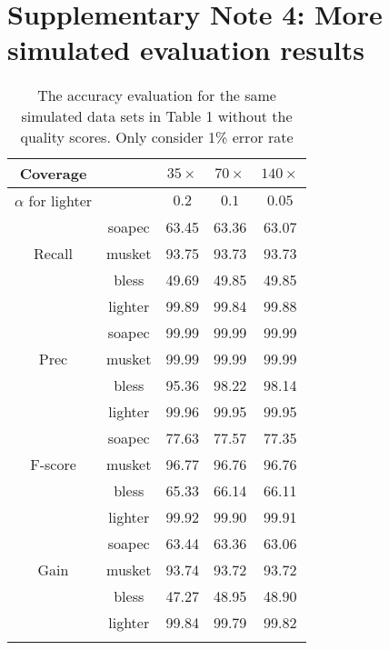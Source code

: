\documentclass[10pt]{article}
\begin{document}

\section*{Supplementary Note 4: More simulated evaluation results}
\begin{table}[h!]
\caption{The accuracy evaluation for the same simulated data sets in Table 1 without the quality scores. Only consider 1\% error rate}
\begin{tabular}{|c|c|c|c|c|}  \hline
Coverage &	&$35\times$  & $70\times$ & $140\times$ \\ \hline
$\alpha$ for lighter & & $0.2$ & $0.1$ & $0.05$ \\ \hhline{|=|=|=|=|=|}
		&soapec	&63.45	&63.36	&63.07  \\ \hline
Recall	&musket	&93.75	&93.73	&93.73   \\ \hline
		&bless	&49.69	&49.85	&49.85	 \\ \hline
		&lighter	&99.89	&99.84	&99.88	 \\ \hhline{|=|=|=|=|=|}
		
		&soapec	&99.99	&99.99	&99.99    \\ \hline
Prec	&musket	&99.99	&99.99	&99.99	 \\ \hline
		&bless	&95.36	&98.22	&98.14	 \\ \hline
		&lighter	&99.96	&99.95	&99.95	 \\  \hhline{|=|=|=|=|=|}
		
		&soapec	&77.63	&77.57	&77.35	 \\ \hline
F-score	&musket	&96.77	&96.76	&96.76	 \\ \hline
		&bless	&65.33	&66.14	&66.11	 \\ \hline
		&lighter	&99.92	&99.90	&99.91	 \\ \hline
		
		&soapec	&63.44	&63.36	&63.06	 \\ \hline
Gain	&musket	&93.74	&93.72	&93.72	 \\ \hline
		&bless	&47.27	&48.95	&48.90	 \\ \hline
		&lighter	&99.84	&99.79	&99.82 \\ \hhline{|=|=|=|=|=|}
\end{tabular}
\end{table}
\end{document}
